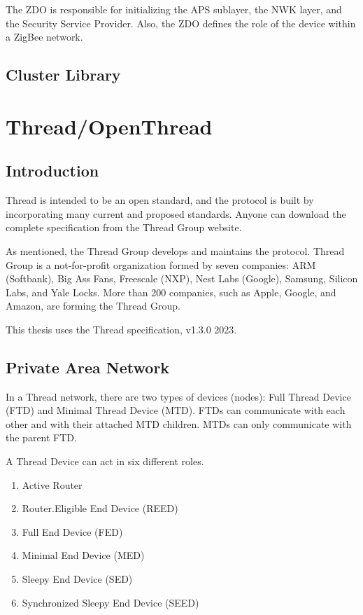 The ZDO is responsible for initializing the APS sublayer, the NWK layer, and the Security Service Provider. Also, the ZDO defines the role of the device within a ZigBee network.
\subsection{Cluster Library}


\section{Thread/OpenThread}
\label{sec:ot}

\subsection{Introduction}
\label{sec:ot:intro}
Thread is intended to be an open standard, and the protocol is built by incorporating many
current and proposed standards.\cite{unwala:2018}
Anyone can download the complete specification from the Thread Group website. \cite{thread:130}

As mentioned, the Thread Group develops and maintains the protocol.
Thread Group is a not-for-profit organization formed by seven companies:
ARM (Softbank), Big Ass Fans, Freescale (NXP), Nest Labs (Google), Samsung, Silicon Labs, and Yale Locks.
More than 200 companies, such as Apple, Google, and Amazon, are forming the Thread Group. \cite{thread:members}

This thesis uses the Thread specification, v1.3.0 2023.

\subsection{Private Area Network}
\label{sec:ot:pan}
In a Thread network, there are two types of devices (nodes): Full Thread Device (FTD) and Minimal Thread Device (MTD). FTDs can communicate with each other and with their attached MTD children. MTDs can only communicate with the parent FTD.

A Thread Device can act in six different roles.
\begin{enumerate}
    \item Active Router
    \item Router.Eligible End Device (REED)
    \item Full End Device (FED)
    \item Minimal End Device (MED)
    \item Sleepy End Device (SED)
    \item Synchronized Sleepy End Device (SEED)
\end{enumerate}

